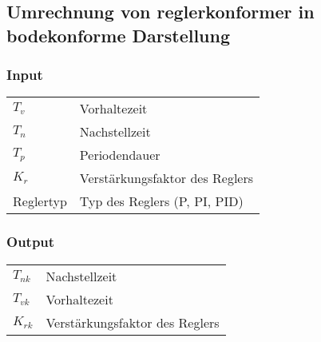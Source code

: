 \subsection{Umrechnung von reglerkonformer in bodekonforme Darstellung}

\subsubsection*{Input}
\begin{tabular}{p{40mm}l}
    $ T_v $        & Vorhaltezeit \\
    $ T_n $        & Nachstellzeit \\
    $ T_p $        & Periodendauer \\
    $ K_r $        & Verst\"arkungsfaktor des Reglers \\
      Reglertyp    & Typ des Reglers (P, PI, PID)
\end{tabular}

\subsubsection*{Output}
\begin{tabular}{p{40mm}l}
    $ T_{nk} $ & Nachstellzeit \\
    $ T_{vk} $ & Vorhaltezeit \\
    $ K_{rk} $ & Verst\"arkungsfaktor des Reglers
\end{tabular}

